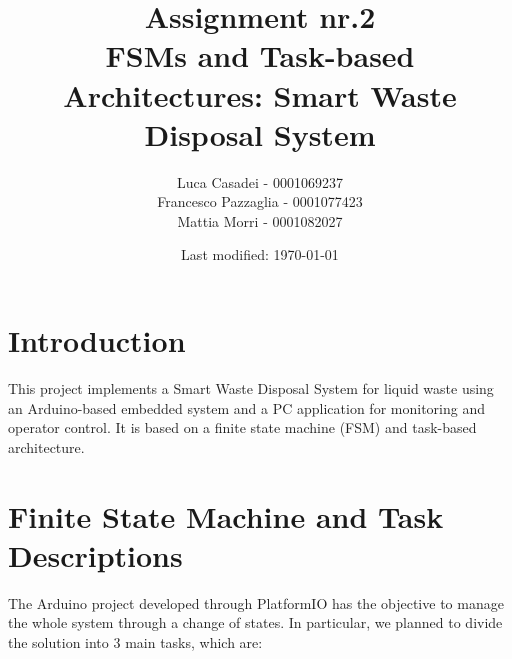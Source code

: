 \documentclass[a4paper]{article}
\author{Luca Casadei - 0001069237\\Francesco Pazzaglia - 0001077423\\Mattia Morri - 0001082027}
\date{Last modified: \today}
\title{\textbf{Assignment nr.2\\FSMs and Task-based Architectures: Smart Waste Disposal System}}
\begin{document}
	\maketitle
	\tableofcontents
	\section{Introduction}
	This project implements a Smart Waste Disposal System for liquid waste using an Arduino-based embedded system and a PC application for monitoring and operator control. It is based on a finite state machine (FSM) and task-based architecture.
	
	\section{Finite State Machine and Task Descriptions}
	The Arduino project developed through PlatformIO has the objective to manage the whole system through a change of states. In particular, we planned to divide the solution into 3 main tasks, which are:
\end{document}
